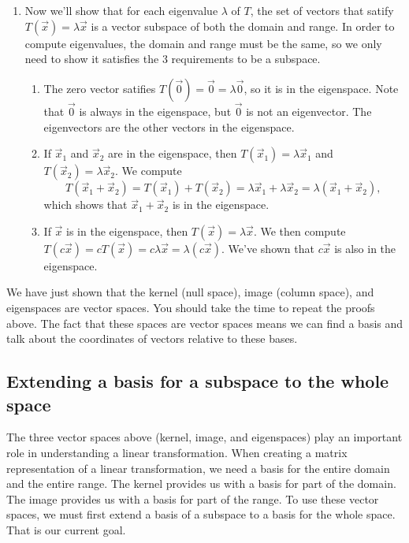 \begin{example}
\begin{enumerate}
	\item Now we'll show that for each eigenvalue $\lambda$ of $T$, the set of vectors that satify $T(\vec x) = \lambda \vec x$ is a vector subspace of both the domain and range.  In order to compute eigenvalues, the domain and range must be the same, so we only need to show it satisfies the 3 requirements to be a subspace.
\begin{enumerate}
	\item The zero vector satifies $T(\vec 0) = \vec 0 = \lambda \vec 0$, so it is in the eigenspace.  Note that $\vec 0$ is always in the eigenspace, but $\vec 0$ is not an eigenvector. The eigenvectors are the other vectors in the eigenspace.
	\item If $\vec x_1$ and $\vec x_2$ are in the eigenspace, then $T(\vec x_1)=\lambda \vec x_1$ and $T(\vec x_2)=\lambda \vec x_2$. We compute $$T(\vec x_1+\vec x_2)=T(\vec x_1)+T(\vec x_2)=\lambda \vec x_1+\lambda \vec x_2 = \lambda (\vec x_1+\vec x_2),$$ which shows that $\vec x_1+\vec x_2$ is in the eigenspace.
	\item If $\vec x$ is in the eigenspace, then $T(\vec x)=\lambda \vec x$. We then compute $T(c\vec x)=cT(\vec x)=c\lambda \vec x= \lambda (c\vec x)$. We've shown that $c\vec x$ is also in the eigenspace.
\end{enumerate}
\end{enumerate}
We have just shown that the kernel (null space), image (column space), and eigenspaces are vector spaces. You should take the time to repeat the proofs above. The fact that these spaces are vector spaces means we can find a basis and talk about the coordinates of vectors relative to these bases.  
\end{example}



\subsection{Extending a basis for a subspace to the whole space}
The three vector spaces above (kernel, image, and eigenspaces) play an important role in understanding a linear transformation. When creating a matrix representation of a linear transformation, we need a basis for the entire domain and the entire range.  The kernel provides us with a basis for part of the domain. The image provides us with a basis for part of the range.  To use these vector spaces, we must first extend a basis of a subspace to a basis for the whole space.  That is our current goal.


